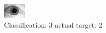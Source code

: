\begin{figure}[h!]
\begin{center}
\includegraphics[width=0.60\columnwidth]{figures/ID1772_class_3_target_2.png}
\end{center}
\caption{ Classification: 3 actual target: 2}
\label{fig:ID1772_class_3_target_2}
\end{figure}
